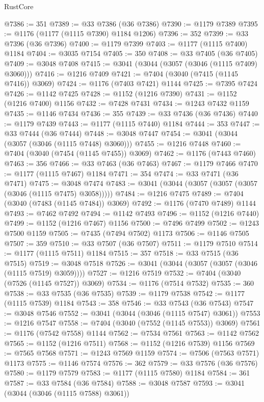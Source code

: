 \begin{lexlean}{RustCore}
\begin{coremodule}
@7386 := 351
@7389 := @33 @7386 (@36 @7386)
@7390 := @1179 @7389
@7395 := @1176 (@1177 (@1115 @7390) @1184 @1206)
@7396 := 352
@7399 := @33 @7396 (@36 @7396)
@7400 := @1179 @7399
@7403 := @1177 (@1115 @7400) @1184
@7404 := @3035 @7154
@7405 := 350
@7408 := @33 @7405 (@36 @7405)
@7409 := @3048 @7408
@7415 := @3041 (@3044 (@3057 (@3046 (@1115 @7409) @3060)))
@7416 := @1216 @7409
@7421 := @7404 (@3040 (@7415 (@1145 @7416)) @3069)
@7424 := @1176 (@7403 @7421) @1144
@7425 := @7395 @7424
@7426 := @1142 @7425
@7428 := @1152 (@1216 @7390)
@7431 := @1152 (@1216 @7400) @1156
@7432 := @7428 @7431
@7434 := @1243 @7432 @1159
@7435 := @1146 @7434
@7436 := 355
@7439 := @33 @7436 (@36 @7436)
@7440 := @1179 @7439
@7443 := @1177 (@1115 @7440) @1184
@7444 := 353
@7447 := @33 @7444 (@36 @7444)
@7448 := @3048 @7447
@7454 := @3041 (@3044 (@3057 (@3046 (@1115 @7448) @3060)))
@7455 := @1216 @7448
@7460 := @7404 (@3040 (@7454 (@1145 @7455)) @3069)
@7462 := @1176 (@7443 @7460)
@7463 := 356
@7466 := @33 @7463 (@36 @7463)
@7467 := @1179 @7466
@7470 := @1177 (@1115 @7467) @1184
@7471 := 354
@7474 := @33 @7471 (@36 @7471)
@7475 := @3048 @7474
@7483 := @3041 (@3044 (@3057 (@3057 (@3057 (@3046 (@1115 @7475) @3058)))))
@7484 := @1216 @7475
@7489 := @7404 (@3040 (@7483 (@1145 @7484)) @3069)
@7492 := @1176 (@7470 @7489) @1144
@7493 := @7462 @7492
@7494 := @1142 @7493
@7496 := @1152 (@1216 @7440)
@7499 := @1152 (@1216 @7467) @1156
@7500 := @7496 @7499
@7502 := @1243 @7500 @1159
@7505 := @7435 (@7494 @7502) @1173
@7506 := @1146 @7505
@7507 := 359
@7510 := @33 @7507 (@36 @7507)
@7511 := @1179 @7510
@7514 := @1177 (@1115 @7511) @1184
@7515 := 357
@7518 := @33 @7515 (@36 @7515)
@7519 := @3048 @7518
@7526 := @3041 (@3044 (@3057 (@3057 (@3046 (@1115 @7519) @3059))))
@7527 := @1216 @7519
@7532 := @7404 (@3040 (@7526 (@1145 @7527)) @3069)
@7534 := @1176 (@7514 @7532)
@7535 := 360
@7538 := @33 @7535 (@36 @7535)
@7539 := @1179 @7538
@7542 := @1177 (@1115 @7539) @1184
@7543 := 358
@7546 := @33 @7543 (@36 @7543)
@7547 := @3048 @7546
@7552 := @3041 (@3044 (@3046 (@1115 @7547) @3061))
@7553 := @1216 @7547
@7558 := @7404 (@3040 (@7552 (@1145 @7553)) @3069)
@7561 := @1176 (@7542 @7558) @1144
@7562 := @7534 @7561
@7563 := @1142 @7562
@7565 := @1152 (@1216 @7511)
@7568 := @1152 (@1216 @7539) @1156
@7569 := @7565 @7568
@7571 := @1243 @7569 @1159
@7574 := @7506 (@7563 @7571) @1173
@7575 := @1146 @7574
@7576 := 362
@7579 := @33 @7576 (@36 @7576)
@7580 := @1179 @7579
@7583 := @1177 (@1115 @7580) @1184
@7584 := 361
@7587 := @33 @7584 (@36 @7584)
@7588 := @3048 @7587
@7593 := @3041 (@3044 (@3046 (@1115 @7588) @3061))

\end{coremodule}
\end{lexlean}
